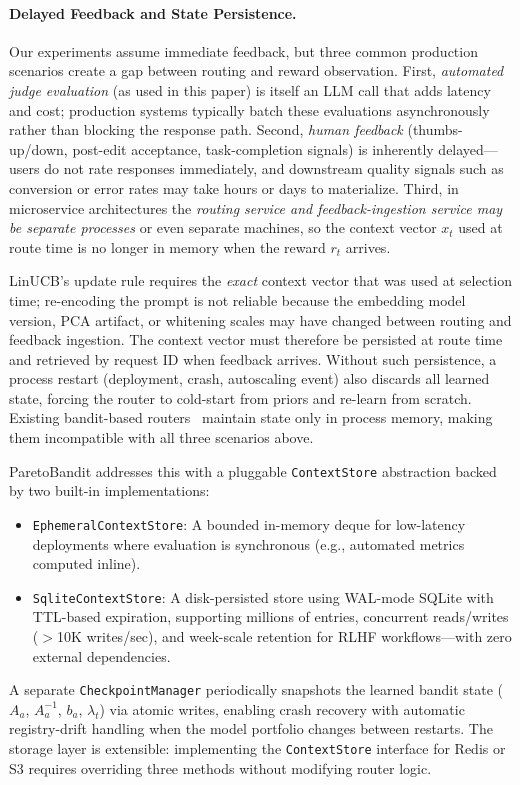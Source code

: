 \paragraph{Delayed Feedback and State Persistence.}
Our experiments assume immediate feedback, but three common production scenarios create a gap between routing and reward observation.
First, \emph{automated judge evaluation} (as used in this paper) is itself an LLM call that adds latency and cost; production systems typically batch these evaluations asynchronously rather than blocking the response path.
Second, \emph{human feedback} (thumbs-up/down, post-edit acceptance, task-completion signals) is inherently delayed---users do not rate responses immediately, and downstream quality signals such as conversion or error rates may take hours or days to materialize.
Third, in microservice architectures the \emph{routing service and feedback-ingestion service may be separate processes} or even separate machines, so the context vector $x_t$ used at route time is no longer in memory when the reward $r_t$ arrives.

LinUCB's update rule requires the \emph{exact} context vector that was used at selection time; re-encoding the prompt is not reliable because the embedding model version, PCA artifact, or whitening scales may have changed between routing and feedback ingestion.
The context vector must therefore be persisted at route time and retrieved by request ID when feedback arrives.
Without such persistence, a process restart (deployment, crash, autoscaling event) also discards all learned state, forcing the router to cold-start from priors and re-learn from scratch.
Existing bandit-based routers~\cite{panda2025pilot,wang2025barp,li2025llmbandit} maintain state only in process memory, making them incompatible with all three scenarios above.

ParetoBandit addresses this with a pluggable \texttt{ContextStore} abstraction backed by two built-in implementations:
\begin{itemize}[nosep,leftmargin=*]
  \item \texttt{EphemeralContextStore}: A bounded in-memory deque for low-latency deployments where evaluation is synchronous (e.g., automated metrics computed inline).
  \item \texttt{SqliteContextStore}: A disk-persisted store using WAL-mode SQLite with TTL-based expiration, supporting millions of entries, concurrent reads/writes ($>$10K writes/sec), and week-scale retention for RLHF workflows---with zero external dependencies.
\end{itemize}
A separate \texttt{CheckpointManager} periodically snapshots the learned bandit state ($A_a$, $A_a^{-1}$, $b_a$, $\lambda_t$) via atomic writes, enabling crash recovery with automatic registry-drift handling when the model portfolio changes between restarts.
The storage layer is extensible: implementing the \texttt{ContextStore} interface for Redis or S3 requires overriding three methods without modifying router logic.

